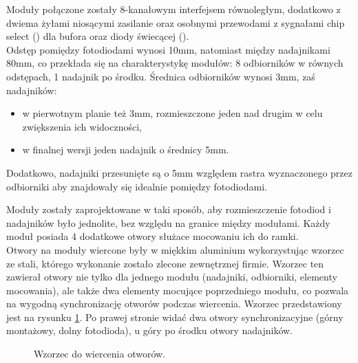 Moduły połączone zostały 8-kanałowym interfejsem równoległym, dodatkowo z dwiema żyłami niosącymi zasilanie oraz osobnymi przewodami z sygnałami chip select () dla bufora oraz diody świecącej ().\\

Odstęp pomiędzy fotodiodami wynosi 10mm, natomiast między nadajnikami 80mm, co przekłada się na charakterystykę modułów: 8 odbiorników w równych odstępach, 1 nadajnik po środku.
Średnica odbiorników wynosi 3mm, zaś nadajników:
\begin{itemize}
 \item w pierwotnym planie też 3mm, rozmieszczone jeden nad drugim w celu zwiększenia ich widoczności,
 \item w finalnej wersji jeden nadajnik o średnicy 5mm.
\end{itemize}

Dodatkowo, nadajniki przesunięte są o 5mm względem rastra wyznaczonego przez odbiorniki \pauza aby znajdowały się idealnie pomiędzy fotodiodami.

Moduły zostały zaprojektowane w taki sposób, aby rozmieszczenie fotodiod i nadajników było jednolite, bez względu na granice między modułami. Każdy moduł posiada 4 dodatkowe otwory służace mocowaniu ich do ramki.\\

Otwory na moduły wiercone były w miękkim aluminium wykorzystując wzorzec ze stali, którego wykonanie zostało zlecone zewnętrznej firmie.
Wzorzec ten zawierał otwory nie tylko dla jednego modułu (nadajniki, odbiorniki, elementy mocowania), ale także dwa elementy mocujące poprzedniego modułu, co pozwala na wygodną synchronizację otworów podczas wiercenia. Wzorzec przedstawiony jest na rysunku \ref{fig:holes_master}. Po prawej stronie widać dwa otwory synchronizacyjne (górny \ppauza montażowy, dolny \ppauza fotodioda), u góry po środku otwory nadajników.\\

\begin{figure}
 \centering
 \makebox[\textwidth][r]{
  \resizebox{.9\largefigure}{!}{
    \def\svgwidth{0.9\largefigure}
    
  }
 }
 \caption{Wzorzec do wiercenia otworów.}
 \label{fig:holes_master}
\end{figure}

